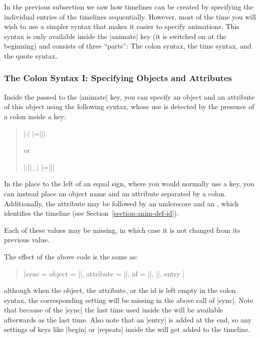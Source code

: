 In the previous subsection we saw how timelines can be created by specifying
the individual entries of the timelines sequentially. However, most of the time
you will wish to use a simpler syntax that makes it easier to specify
animations. This syntax is only available inside the |animate| key (it is
switched on at the beginning) and consists of three ``parts'': The colon
syntax, the time syntax, and the quote syntax.


\subsubsection{The Colon Syntax I: Specifying Objects and Attributes}
\label{section-anim-syntax-obj}

Inside the  passed to the |animate| key, you can
specify an object and an attribute of this object using the following syntax,
whose use is detected by the presence of a colon inside a key:
%
\begin{quote}
  \normalfont
  |:|
  |={||}|

  or

  |:||_|
  |={||}|
\end{quote}
%
In the place to the left of an equal sign, where you would normally use a key,
you can instead place an object name and an attribute separated by a colon.
Additionally, the attribute may be followed by an underscore and an ,
which identifies the timeline (see Section~\ref{section-anim-def-id}).

Each of these values may be missing, in which case it is not changed from its
previous value.

The effect of the above code is the same as:
%
\begin{quote}
  \normalfont
  |sync = { object = ||, attribute = ||, id = ||, ||, entry }|
\end{quote}
%
although when the object, the attribute, or the id is left empty in the colon
syntax, the corresponding setting will be missing in the above call of |sync|.
Note that because of the |sync| the last time used inside the 
will be available afterwards as the last time. Also note that an |entry| is
added at the end, so any settings of keys like |begin| or |repeats| inside the
 will get added to the timeline.

